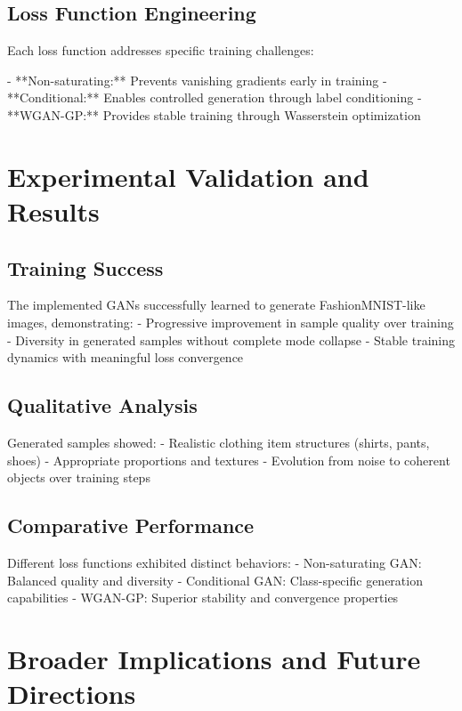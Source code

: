 \documentclass{article}
\begin{document}
\subsection{Loss Function Engineering}

Each loss function addresses specific training challenges:

- **Non-saturating:** Prevents vanishing gradients early in training
- **Conditional:** Enables controlled generation through label conditioning
- **WGAN-GP:** Provides stable training through Wasserstein optimization

\section{Experimental Validation and Results}

\subsection{Training Success}

The implemented GANs successfully learned to generate FashionMNIST-like images, demonstrating:
- Progressive improvement in sample quality over training
- Diversity in generated samples without complete mode collapse
- Stable training dynamics with meaningful loss convergence

\subsection{Qualitative Analysis}

Generated samples showed:
- Realistic clothing item structures (shirts, pants, shoes)
- Appropriate proportions and textures
- Evolution from noise to coherent objects over training steps

\subsection{Comparative Performance}

Different loss functions exhibited distinct behaviors:
- Non-saturating GAN: Balanced quality and diversity
- Conditional GAN: Class-specific generation capabilities
- WGAN-GP: Superior stability and convergence properties

\section{Broader Implications and Future Directions}
\end{document}
